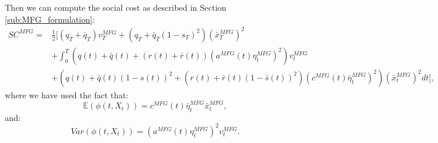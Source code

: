 \documentclass[11pt]{article}
\begin{document}
Then we can compute the social cost as described in Section \ref{sub:MFG_formulation}:
\begin{equation*}
\begin{split}
    SC^{MFG}=&\frac{1}{2}[(q_T+\bar{q}_T)v_T^{MFG}+(q_T+\bar{q}_T(1-s_T)^2)(\bar{x}_T^{MFG})^2\\
    &+\int_0^T (q(t)+\bar{q}(t)+(r(t)+\bar{r}(t))(a^{MFG}(t)\eta_t^{MFG})^2)v_t^{MFG}\\
    &+(q(t)+\bar{q}(t)(1-s(t))^2+(r(t)+\bar{r}(t)(1-\bar{s}(t))^2)(c^{MFG}(t)\bar{\eta}_t^{MFG})^2)(\bar{x}_t^{MFG})^2dt],
\end{split}
\end{equation*}
where we have used the fact that:
\begin{equation*}
    \mathbb{E}(\phi(t,X_t))=c^{MFG}(t)\bar{\eta}_t^{MFG}\bar{x}_t^{MFG},
\end{equation*}
and:
\begin{equation*}
    Var(\phi(t,X_t))=(a^{MFG}(t)\eta_t^{MFG})^2v^{MFG}_t.
\end{equation*}
\end{document}
